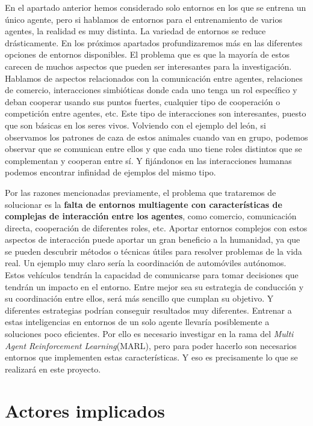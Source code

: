 En el apartado anterior hemos considerado solo entornos en los que se entrena un único agente, pero si hablamos de entornos para el entrenamiento de varios agentes, la realidad es muy distinta. La variedad de entornos se reduce drásticamente. En los próximos apartados profundizaremos más en las diferentes opciones de entornos disponibles. El problema que es que la mayoría de estos carecen de muchos aspectos que pueden ser interesantes para la investigación. Hablamos de aspectos relacionados con la comunicación entre agentes, relaciones de comercio, interacciones simbióticas donde cada uno tenga un rol específico y deban cooperar usando sus puntos fuertes, cualquier tipo de cooperación o competición entre agentes, etc. Este tipo de interacciones son interesantes, puesto que son básicas en los seres vivos. Volviendo con el ejemplo del león, si observamos los patrones de caza de estos animales cuando van en grupo, podemos observar que se comunican entre ellos y que cada uno tiene roles distintos que se complementan y cooperan entre sí. Y fijándonos en las interacciones humanas podemos encontrar infinidad de ejemplos del mismo tipo.

Por las razones mencionadas previamente, el problema que trataremos de solucionar es la \textbf{falta de entornos multiagente con características de complejas de interacción entre los agentes}, como comercio, comunicación directa, cooperación de diferentes roles, etc. Aportar entornos complejos con estos aspectos de interacción puede aportar un gran beneficio a la humanidad, ya que se pueden descubrir métodos o técnicas útiles para resolver problemas de la vida real. Un ejemplo muy claro sería la coordinación de automóviles autónomos. Estos vehículos tendrán la capacidad de comunicarse para tomar decisiones que tendrán un impacto en el entorno. Entre mejor sea su estrategia de conducción y su coordinación entre ellos, será más sencillo que cumplan su objetivo. Y diferentes estrategias podrían conseguir resultados muy diferentes. Entrenar a estas inteligencias en entornos de un solo agente llevaría posiblemente a soluciones poco eficientes. Por ello es necesario investigar en la rama del \emph{Multi Agent Reinforcement Learning}(MARL), pero para poder hacerlo son necesarios entornos que implementen estas características. Y eso es precisamente lo que se realizará en este proyecto.

\section{Actores implicados}

